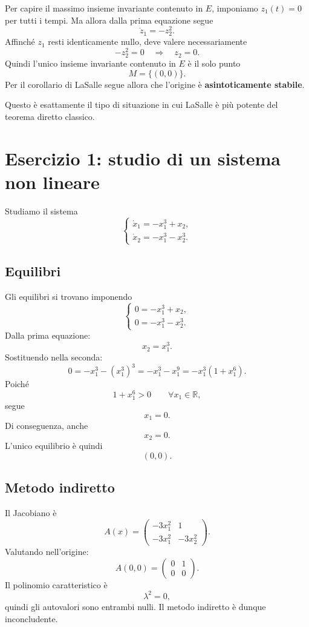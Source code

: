 Per capire il massimo insieme invariante contenuto in \(E\), imponiamo \(z_1(t)=0\) per tutti i tempi.  
Ma allora dalla prima equazione segue
\[
\dot z_1 = -z_2^2.
\]
Affinché \(z_1\) resti identicamente nullo, deve valere necessariamente
\[
-z_2^2=0 \quad \Longrightarrow \quad z_2=0.
\]
Quindi l'unico insieme invariante contenuto in \(E\) è il solo punto
\[
M=\{(0,0)\}.
\]
Per il corollario di LaSalle segue allora che l'origine è \textbf{asintoticamente stabile}.

Questo è esattamente il tipo di situazione in cui LaSalle è più potente del teorema diretto classico.

\section{Esercizio 1: studio di un sistema non lineare}
\label{sec:L23-es1}

Studiamo il sistema
\begin{equation}
\label{eq:L23-es1}
\begin{cases}
\dot x_1 = -x_1^3 + x_2,\\[4pt]
\dot x_2 = -x_1^3 - x_2^3.
\end{cases}
\end{equation}

\subsection{Equilibri}

Gli equilibri si trovano imponendo
\[
\begin{cases}
0 = -x_1^3 + x_2,\\[4pt]
0 = -x_1^3 - x_2^3.
\end{cases}
\]
Dalla prima equazione:
\[
x_2=x_1^3.
\]
Sostituendo nella seconda:
\[
0=-x_1^3-(x_1^3)^3=-x_1^3-x_1^9=-x_1^3(1+x_1^6).
\]
Poiché
\[
1+x_1^6>0 \qquad \forall x_1\in\mathbb{R},
\]
segue
\[
x_1=0.
\]
Di conseguenza, anche
\[
x_2=0.
\]
L'unico equilibrio è quindi
\[
(0,0).
\]

\subsection{Metodo indiretto}

Il Jacobiano è
\[
A(x)=
\begin{pmatrix}
-3x_1^2 & 1\\[4pt]
-3x_1^2 & -3x_2^2
\end{pmatrix}.
\]
Valutando nell'origine:
\[
A(0,0)=
\begin{pmatrix}
0 & 1\\
0 & 0
\end{pmatrix}.
\]
Il polinomio caratteristico è
\[
\lambda^2=0,
\]
quindi gli autovalori sono entrambi nulli. Il metodo indiretto è dunque inconcludente.

